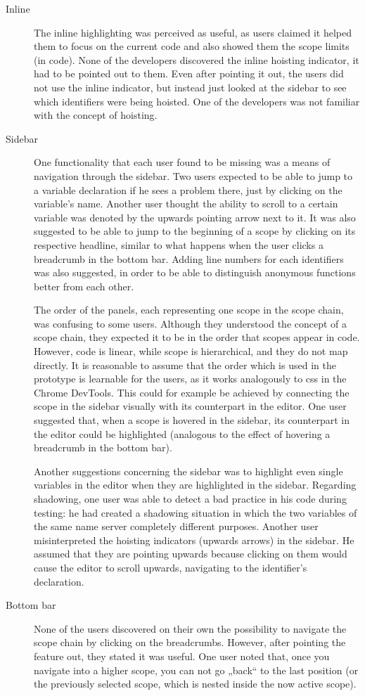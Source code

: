 \begin{description}
\item[Inline]
The inline highlighting was perceived as useful, as users claimed it
helped them to focus on the current code and also showed them the scope
limits (in code). None of the developers discovered the inline hoisting
indicator, it had to be pointed out to them. Even after pointing it out,
the users did not use the inline indicator, but instead just looked at
the sidebar to see which identifiers were being hoisted. One of the
developers was not familiar with the concept of hoisting.
\item[Sidebar]
One functionality that each user found to be missing was a means of
navigation through the sidebar. Two users expected to be able to jump to
a variable declaration if he sees a problem there, just by clicking on
the variable’s name. Another user thought the ability to scroll to a
certain variable was denoted by the upwards pointing arrow next to it.
It was also suggested to be able to jump to the beginning of a scope by
clicking on its respective headline, similar to what happens when the
user clicks a breadcrumb in the bottom bar. Adding line numbers for each
identifiers was also suggested, in order to be able to distinguish
anonymous functions better from each other.

The order of the panels, each representing one scope in the scope chain,
was confusing to some users. Although they understood the concept of a
scope chain, they expected it to be in the order that scopes appear in
code. However, code is linear, while scope is hierarchical, and they do
not map directly. It is reasonable to assume that the order which is
used in the prototype is learnable for the users, as it works
analogously to \ac{css} in the Chrome DevTools. This could for example
be achieved by connecting the scope in the sidebar visually with its
counterpart in the editor. One user suggested that, when a scope is
hovered in the sidebar, its counterpart in the editor could be
highlighted (analogous to the effect of hovering a breadcrumb in the
bottom bar).

Another suggestions concerning the sidebar was to highlight even single
variables in the editor when they are highlighted in the sidebar.
Regarding shadowing, one user was able to detect a bad practice in his
code during testing: he had created a shadowing situation in which the
two variables of the same name server completely different purposes.
Another user misinterpreted the hoisting indicators (upwards arrows) in
the sidebar. He assumed that they are pointing upwards because clicking
on them would cause the editor to scroll upwards, navigating to the
identifier’s declaration.
\item[Bottom bar]
None of the users discovered on their own the possibility to navigate
the scope chain by clicking on the breadcrumbs. However, after pointing
the feature out, they stated it was useful. One user noted that, once
you navigate into a higher scope, you can not go „back“ to the last
position (or the previously selected scope, which is nested inside the
now active scope).


\end{description}
